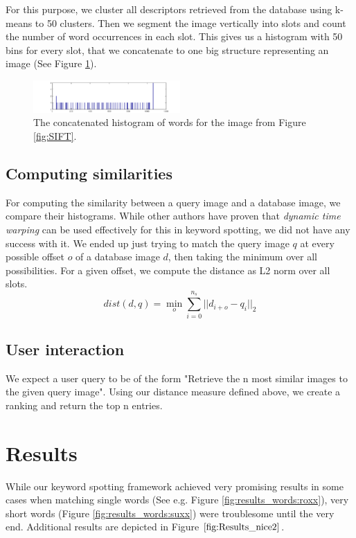 \documentclass[conference]{IEEEtran}
\begin{document}
For this purpose, we cluster all descriptors retrieved from the database using k-means to
50 clusters. Then we segment the image vertically into slots and count the number of word occurrences
in each slot. This gives us a histogram with 50 bins for every slot, that we concatenate to one
big structure representing an image (See Figure \ref{fig:histogram}).
\begin{figure}[!t]
\centering
\includegraphics[width=0.5\textwidth]{kvniginne_histogram}
\caption{The concatenated histogram of words for the image from Figure \ref{fig:SIFT}.}
\label{fig:histogram}
\end{figure}

\subsection{Computing similarities}
\label{sub:similarities}
For computing the similarity between a query image and a database image, 
we compare their histograms. While other authors have proven that \emph{dynamic time warping} can be
used effectively for this in keyword spotting, we did not have any success with it. We ended
up just trying to match the query image $q$ 
at every possible offset $o$ of a database image $d$, then taking
the minimum over all possibilities.
 For a given offset, we compute the distance as L2 norm over all slots.
\begin{equation}
	dist(d, q) = \min_o \sum_{i = 0}^{n_s} || d_{i + o} - q_{i}  ||_2
\end{equation}


\subsection{User interaction}
\label{sub:user interaction}
We expect a user query to be of the form "Retrieve the n most similar images to the given query
image". Using our distance measure defined above, 
we create a ranking and return the top n entries.

\section{Results}
While our keyword spotting framework achieved very promising results in some cases when matching single words (See e.g. Figure \ref{fig:results_words:roxx}), very short words (Figure \ref{fig:results_words:suxx}) were troublesome until the very end. Additional results are depicted in Figure $\ref{fig:Results_nice2}$.
\end{document}
